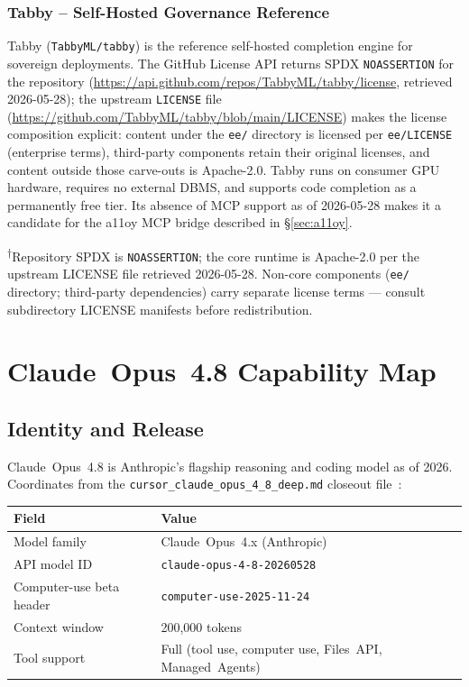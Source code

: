 \subsubsection{Tabby -- Self-Hosted Governance Reference}
Tabby (\texttt{TabbyML/tabby}) is the reference self-hosted completion
engine for sovereign deployments.  The GitHub License API returns SPDX
\texttt{NOASSERTION} for the repository
(\url{https://api.github.com/repos/TabbyML/tabby/license}, retrieved
2026-05-28); the upstream \texttt{LICENSE} file
(\url{https://github.com/TabbyML/tabby/blob/main/LICENSE}) makes the
license composition explicit: content under the \texttt{ee/} directory is
licensed per \texttt{ee/LICENSE} (enterprise terms), third-party components
retain their original licenses, and content outside those carve-outs is
Apache-2.0.  Tabby runs on consumer GPU hardware, requires no external
DBMS, and supports code completion as a permanently free tier.  Its
absence of MCP support as of 2026-05-28 makes it a candidate for the
a11oy MCP bridge described in \S\ref{sec:a11oy}.

\noindent\textsuperscript{$\dagger$}Repository SPDX is \texttt{NOASSERTION};
the core runtime is Apache-2.0 per the upstream LICENSE file retrieved
2026-05-28.  Non-core components (\texttt{ee/} directory; third-party
dependencies) carry separate license terms --- consult subdirectory
LICENSE manifests before redistribution.

\section{Claude~Opus~4.8 Capability Map}
\label{sec:claude-opus}

\subsection{Identity and Release}
\label{ssec:opus-identity}

Claude~Opus~4.8 is Anthropic's flagship reasoning and coding model as of
2026.  Coordinates from the \texttt{cursor\_claude\_opus\_4\_8\_deep.md}
closeout file~\cite{cursor_claude_opus_deep}:

\begin{center}
\begin{tabular}{ll}
\textbf{Field} & \textbf{Value} \\
\hline
Model family & Claude~Opus~4.x (Anthropic) \\
API model ID & \texttt{claude-opus-4-8-20260528} \\
Computer-use beta header & \texttt{computer-use-2025-11-24} \\
Context window & 200,000 tokens \\
Tool support & Full (tool use, computer use, Files~API, Managed~Agents) \\
\end{tabular}
\end{center}

